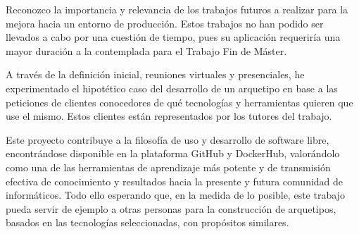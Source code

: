 Reconozco la importancia y relevancia de los trabajos futuros a realizar para la mejora hacia un entorno de producción. Estos trabajos no han podido ser llevados a cabo por una cuestión de tiempo, pues su aplicación requeriría una mayor duración a la contemplada para el Trabajo Fin de Máster.

A través de la definición inicial, reuniones virtuales y presenciales, he experimentado el hipotético caso del desarrollo de un arquetipo en base a las peticiones de clientes conocedores de qué tecnologías y herramientas quieren que use el mismo. Estos clientes están representados por los tutores del trabajo. 

Este proyecto contribuye a la filosofía de uso y desarrollo de software libre, encontrándose disponible en la plataforma GitHub y DockerHub, valorándolo como una de las herramientas de aprendizaje más potente y de transmisión efectiva de conocimiento y resultados hacia la presente y futura comunidad de informáticos. Todo ello esperando que, en la medida de lo posible, este trabajo pueda servir de ejemplo a otras personas para la construcción de arquetipos, basados en las tecnologías seleccionadas, con propósitos similares.

